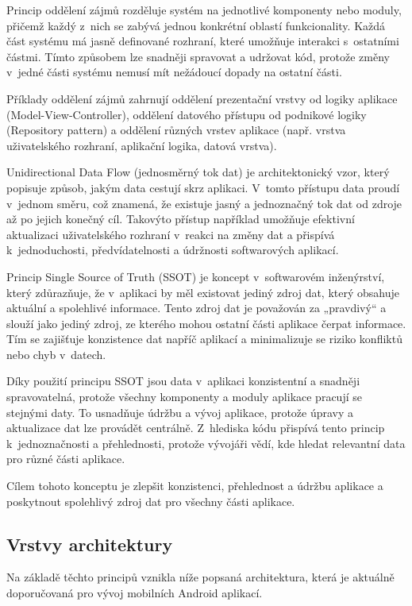 Princip oddělení zájmů rozděluje systém na jednotlivé komponenty nebo moduly, přičemž každý z~nich se zabývá jednou konkrétní 
oblastí funkcionality. Každá část systému má jasně definované rozhraní, které umožňuje interakci s~ostatními částmi. 
Tímto způsobem lze snadněji spravovat a udržovat kód, protože změny v~jedné části systému nemusí mít nežádoucí dopady na ostatní části.

Příklady oddělení zájmů zahrnují oddělení prezentační vrstvy od logiky aplikace (Model-View-Controller), oddělení datového přístupu od 
podnikové logiky (Repository pattern) a oddělení různých vrstev aplikace (např. vrstva uživatelského rozhraní, aplikační logika, datová vrstva). 

Unidirectional Data Flow (jednosměrný tok dat) je architektonický vzor, který popisuje způsob, jakým data cestují skrz aplikaci. 
V~tomto přístupu data proudí v~jednom směru, což znamená, že existuje jasný a jednoznačný tok dat od zdroje až po jejich konečný cíl.
Takovýto přístup například umožňuje efektivní aktualizaci uživatelského rozhraní v~reakci na změny dat a přispívá k~jednoduchosti, 
předvídatelnosti a údržnosti softwarových aplikací.

Princip Single Source of Truth (SSOT) je koncept v~softwarovém inženýrství, který zdůrazňuje, že v~aplikaci by měl existovat jediný 
zdroj dat, který obsahuje aktuální a spolehlivé informace. Tento zdroj dat je považován za „pravdivý“ a slouží jako jediný zdroj, 
ze kterého mohou ostatní části aplikace čerpat informace. Tím se zajišťuje konzistence dat napříč aplikací a minimalizuje se riziko 
konfliktů nebo chyb v~datech.

Díky použití principu SSOT jsou data v~aplikaci konzistentní a snadněji spravovatelná, protože všechny komponenty a moduly aplikace pracují se stejnými 
daty. To usnadňuje údržbu a vývoj aplikace, protože úpravy a aktualizace dat lze provádět centrálně. Z~hlediska kódu přispívá tento
princip k~jednoznačnosti a přehlednosti, protože vývojáři vědí, kde hledat relevantní data pro různé části aplikace.

Cílem tohoto konceptu je zlepšit konzistenci, přehlednost a údržbu aplikace a poskytnout spolehlivý zdroj dat pro všechny části aplikace.


\subsection*{Vrstvy architektury} \label{vrstvyArchitekturySection} 
Na základě těchto principů vznikla níže popsaná architektura, která je aktuálně doporučovaná pro vývoj mobilních Android aplikací.

